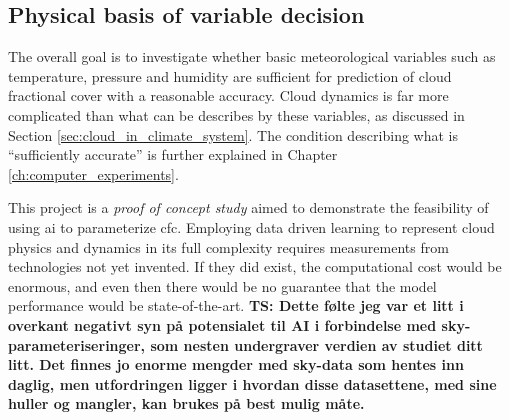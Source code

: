 \subsection{Physical basis of variable decision} \label{sec:ecc}
The overall goal is to investigate whether basic meteorological variables such as temperature, pressure and humidity are sufficient for prediction of cloud fractional cover with a reasonable accuracy. Cloud dynamics is far more complicated than what can be describes by these variables, as discussed in Section \ref{sec:cloud_in_climate_system}.
The condition describing what is ``sufficiently accurate'' is further explained in Chapter \ref{ch:computer_experiments}.

This project is a \textit{proof of concept study} aimed to demonstrate the feasibility of using \acrshort{ai} to parameterize \acrshort{cfc}. Employing data driven learning to represent cloud physics and dynamics in its full complexity requires measurements from technologies not yet invented. If they did exist, the computational cost would be enormous, and even then there would be no guarantee that the model performance would be %
state-of-the-art.
\textbf{TS: Dette følte jeg var et litt i overkant negativt syn på potensialet til AI i forbindelse med sky-parameteriseringer, som nesten undergraver verdien av studiet ditt litt. Det finnes jo enorme mengder med sky-data som hentes inn daglig, men utfordringen ligger i hvordan disse datasettene, med sine huller og mangler, kan brukes på best mulig måte.}


